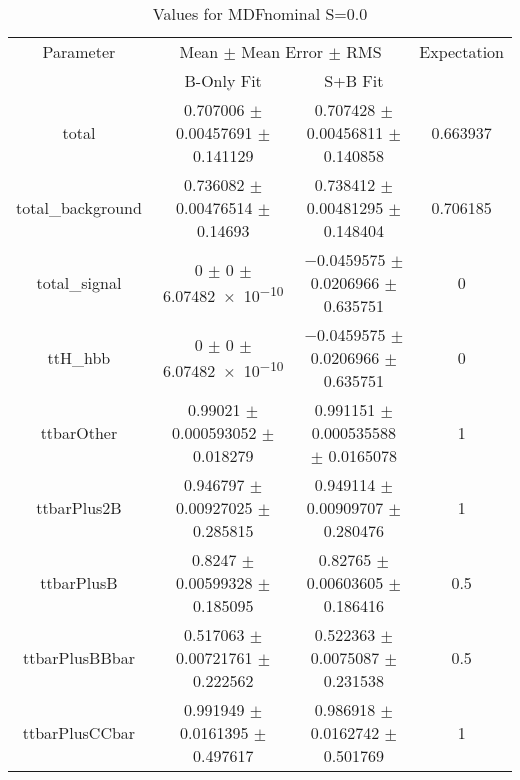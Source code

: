 \begin{table}
\centering
\caption{Values for MDFnominal S=0.0}
\begin{tabular}{cccc}
\toprule
Parameter & \multicolumn{2}{c}{Mean $\pm$ Mean Error $\pm$ RMS} & Expectation\\
 & B-Only Fit & S+B Fit & \\
\midrule
total & \num{0.707006} $\pm$ \num{0.00457691} $\pm$ \num{0.141129} & \num{0.707428} $\pm$ \num{0.00456811} $\pm$ \num{0.140858} & \num{0.663937}\\
total\_background & \num{0.736082} $\pm$ \num{0.00476514} $\pm$ \num{0.14693} & \num{0.738412} $\pm$ \num{0.00481295} $\pm$ \num{0.148404} & \num{0.706185}\\
total\_signal & \num{0} $\pm$ \num{0} $\pm$ \num{6.07482e-10} & \num{-0.0459575} $\pm$ \num{0.0206966} $\pm$ \num{0.635751} & \num{0}\\
ttH\_hbb & \num{0} $\pm$ \num{0} $\pm$ \num{6.07482e-10} & \num{-0.0459575} $\pm$ \num{0.0206966} $\pm$ \num{0.635751} & \num{0}\\
ttbarOther & \num{0.99021} $\pm$ \num{0.000593052} $\pm$ \num{0.018279} & \num{0.991151} $\pm$ \num{0.000535588} $\pm$ \num{0.0165078} & \num{1}\\
ttbarPlus2B & \num{0.946797} $\pm$ \num{0.00927025} $\pm$ \num{0.285815} & \num{0.949114} $\pm$ \num{0.00909707} $\pm$ \num{0.280476} & \num{1}\\
ttbarPlusB & \num{0.8247} $\pm$ \num{0.00599328} $\pm$ \num{0.185095} & \num{0.82765} $\pm$ \num{0.00603605} $\pm$ \num{0.186416} & \num{0.5}\\
ttbarPlusBBbar & \num{0.517063} $\pm$ \num{0.00721761} $\pm$ \num{0.222562} & \num{0.522363} $\pm$ \num{0.0075087} $\pm$ \num{0.231538} & \num{0.5}\\
ttbarPlusCCbar & \num{0.991949} $\pm$ \num{0.0161395} $\pm$ \num{0.497617} & \num{0.986918} $\pm$ \num{0.0162742} $\pm$ \num{0.501769} & \num{1}\\
\bottomrule
\end{tabular}
\end{table}